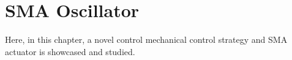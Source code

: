 \chapter{SMA Oscillator}
Here, in this chapter, a novel control mechanical control strategy and SMA actuator is showcased and studied.
